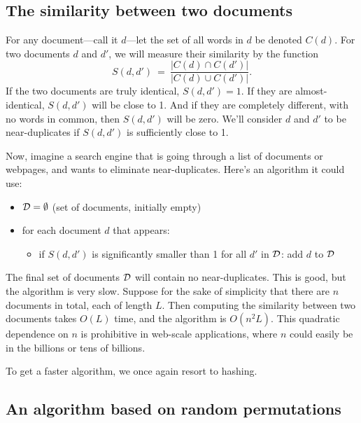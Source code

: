 \subsection{The similarity between two documents}

For any document---call it $d$---let the set of all words in $d$ be denoted $C(d)$. For two documents 
$d$ and $d'$, we will measure their similarity by the function
$$ S(d,d') \ = \ \frac{|C(d) \cap C(d')|}{|C(d) \cup C(d')|} .$$
If the two documents are truly identical, $S(d,d') = 1$. If they are almost-identical, $S(d,d')$ will
be close to 1. And if they are completely different, with no words in common, then $S(d,d')$ will be
zero. We'll consider $d$ and $d'$ to be near-duplicates if $S(d,d')$ is sufficiently close to 1.

Now, imagine a search engine that is going through a list of documents or webpages, and wants to 
eliminate near-duplicates. Here's an algorithm it could use:
\begin{itemize}
\item ${\cal D} = \emptyset$ (set of documents, initially empty)
\item for each document $d$ that appears:
\begin{itemize}
\item if $S(d,d')$ is significantly smaller than 1 for all $d'$ in ${\cal D}$: add $d$ to ${\cal D}$
\end{itemize}
\end{itemize}
The final set of documents ${\cal D}$ will contain no near-duplicates. This is good, but the
algorithm is very slow. Suppose for the sake of simplicity that there are $n$ documents in total,
each of length $L$. Then computing the similarity between two documents takes $O(L)$ time, and
the algorithm is $O(n^2L)$. This quadratic dependence on $n$ is prohibitive in web-scale applications,
where $n$ could easily be in the billions or tens of billions.

To get a faster algorithm, we once again resort to hashing.

\subsection{An algorithm based on random permutations}

